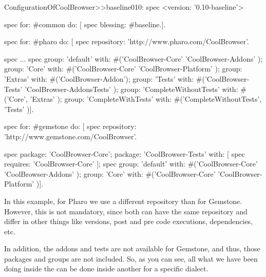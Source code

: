 \documentclass[a4paper,10pt,twoside]{book}
\begin{document}
  \begin{code}{}
 ConfigurationOfCoolBrowser>>baseline010: spec 
	<version: '0.10-baseline'>
	
	spec for: #common do: [
		spec blessing: #baseline.].
	
	spec for: #pharo do: [
		spec repository: 'http://www.pharo.com/CoolBrowser'.
		
		spec 
			...
		spec 
			group: 'default' with: #('CoolBrowser-Core' 'CoolBrowser-Addons' );
			group: 'Core' with: #('CoolBrowser-Core' 'CoolBrowser-Platform' );
			group: 'Extras' with: #('CoolBrowser-Addon');
			group: 'Tests' with: #('CoolBrowser-Tests' 'CoolBrowser-AddonsTests' );
			group: 'CompleteWithoutTests' with: #('Core', 'Extras' );
			group: 'CompleteWithTests' with: #('CompleteWithoutTests', 'Tests' )].
			
	spec for: #gemstone do: [
		spec repository: 'http://www.gemstone.com/CoolBrowser'.
		
		spec 
			package: 'CoolBrowser-Core';
			package: 'CoolBrowser-Tests' with: [ spec requires: 'CoolBrowser-Core' ];
		spec 
			group: 'default' with: #('CoolBrowser-Core' 'CoolBrowser-Addons' );
			group: 'Core' with: #('CoolBrowser-Core' 'CoolBrowser-Platform' )].			

\end{code}	
	
In this example, for Pharo we use a different repository than for Gemstone. However, this is not mandatory, since both can have the same repository and differ in other things like versions, post and pre code executions, dependencies, etc. 

In addition, the addons and tests are not available for Gemstone, and thus, those packages and groups are not included. So, as you can see, all what we have been doing inside the  can be done inside another  for a specific dialect. 


%
%
\end{document}
